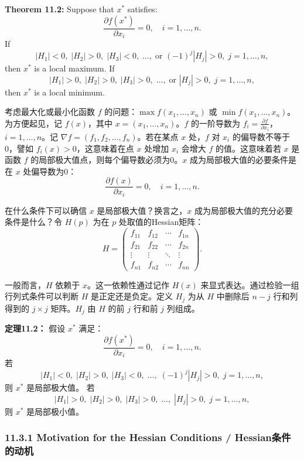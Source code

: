 \begin{original}
\textbf{Theorem 11.2:} Suppose that $x^*$ satisfies:
\[
\frac{\partial f(x^*)}{\partial x_i} = 0, \quad i = 1,\ldots,n.
\]
If
\[
|H_1| < 0,\; |H_2| > 0,\; |H_3| < 0,\; \ldots,\; \text{or } (-1)^j|H_j| > 0,\; j = 1,\ldots,n,
\]
then $x^*$ is a local maximum.
If
\[
|H_1| > 0,\; |H_2| > 0,\; |H_3| > 0,\; \ldots,\; \text{or } |H_j| > 0,\; j = 1,\ldots,n,
\]
then $x^*$ is a local minimum.
\end{original}
\begin{translation}
考虑最大化或最小化函数 $f$ 的问题：$\max f(x_1,\ldots,x_n)$ 或 $\min f(x_1,\ldots,x_n)$。为方便起见，记 $f(x)$，其中 $x = (x_1,\ldots,x_n)$。$f$ 的一阶导数为 $f_i = \frac{\partial f}{\partial x_i}$，$i = 1,\ldots,n$。记 $\nabla f = (f_1, f_2, \ldots, f_n)$。若在某点 $x$ 处，$f$ 对 $x_i$ 的偏导数不等于0，譬如 $f_i(x) > 0$，这意味着在点 $x$ 处增加 $x_i$ 会增大 $f$ 的值。这意味着若 $x$ 是函数 $f$ 的局部极大值点，则每个偏导数必须为0。$x$ 成为局部极大值的必要条件是在 $x$ 处偏导数为0：
\[
\frac{\partial f(x)}{\partial x_i} = 0, \quad i = 1,\ldots,n.
\]

在什么条件下可以确信 $x$ 是局部极大值？换言之，$x$ 成为局部极大值的充分必要条件是什么？令 $H(p)$ 为在 $p$ 处取值的Hessian矩阵：
\[
H = \begin{pmatrix}
f_{11} & f_{12} & \cdots & f_{1n} \\
f_{21} & f_{22} & \cdots & f_{2n} \\
\vdots & \vdots & \ddots & \vdots \\
f_{n1} & f_{n2} & \cdots & f_{nn}
\end{pmatrix}.
\]

一般而言，$H$ 依赖于 $x$。这一依赖性通过记作 $H(x)$ 来显式表达。通过检验一组行列式条件可以判断 $H$ 是正定还是负定。定义 $H_j$ 为从 $H$ 中删除后 $n-j$ 行和列得到的 $j \times j$ 矩阵。$H_j$ 由 $H$ 的前 $j$ 行和前 $j$ 列组成。

\textbf{定理11.2：} 假设 $x^*$ 满足：
\[
\frac{\partial f(x^*)}{\partial x_i} = 0, \quad i = 1,\ldots,n.
\]
若
\[
|H_1| < 0,\; |H_2| > 0,\; |H_3| < 0,\; \ldots,\; (-1)^j|H_j| > 0,\; j = 1,\ldots,n,
\]
则 $x^*$ 是局部极大值。
若
\[
|H_1| > 0,\; |H_2| > 0,\; |H_3| > 0,\; \ldots,\; |H_j| > 0,\; j = 1,\ldots,n,
\]
则 $x^*$ 是局部极小值。
\end{translation}

\subsubsection{11.3.1 Motivation for the Hessian Conditions / Hessian条件的动机}

